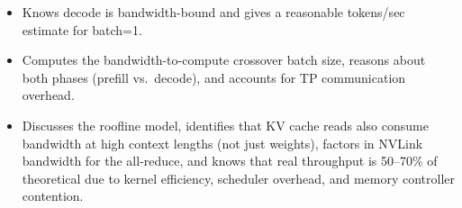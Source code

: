 \begin{interviewq}

\goodgreat
\begin{itemize}
    \item {} Knows decode is bandwidth-bound and gives a reasonable tokens/sec estimate for batch=1.
    \item {} Computes the bandwidth-to-compute crossover batch size, reasons about both phases (prefill vs.\ decode), and accounts for TP communication overhead.
    \item {} Discusses the roofline model, identifies that KV cache reads also consume bandwidth at high context lengths (not just weights), factors in NVLink bandwidth for the all-reduce, and knows that real throughput is 50--70\% of theoretical due to kernel efficiency, scheduler overhead, and memory controller contention.
\end{itemize}

\end{interviewq}


